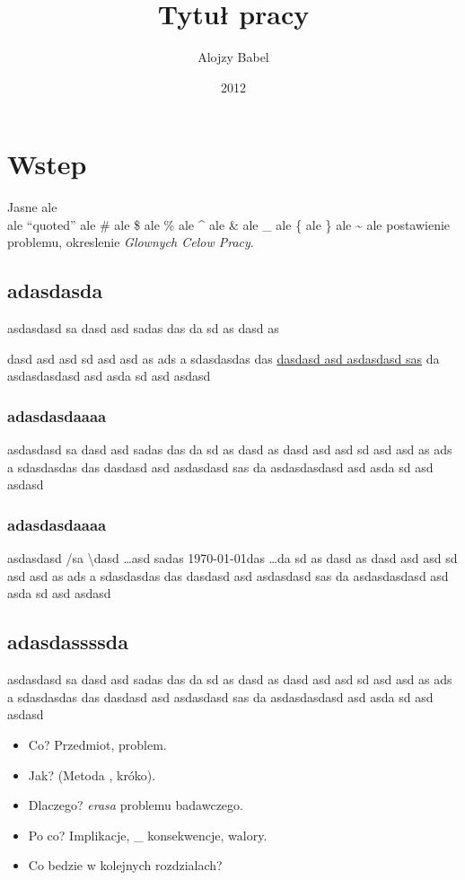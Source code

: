 \documentclass[14pt]{article}
\title{Tytuł pracy}
\author{Alojzy Babel}
\date{2012}
\begin{document}
\maketitle


\section{Wstep}
Jasne ale \\ ale ``quoted'' ale \# ale \$ ale \% ale \^{} ale \& ale \_ ale \{ ale \} ale \~{} ale postawienie problemu, okreslenie \emph{Glownych Celow Pracy}.

\subsection{adasdasda}
asdasdasd sa dasd asd sadas das da sd as dasd as \par
dasd asd asd sd asd asd as ads a sdasdasdas das \underline{dasdasd asd asdasdasd sas} da asdasdasdasd asd asda sd asd asdasd

\subsubsection{adasdasdaaaa}
asdasdasd sa dasd asd sadas das da sd as dasd as dasd \newline
asd asd sd asd asd as ads a sdasdasdas das dasdasd asd asdasdasd sas da asdasdasdasd asd asda sd asd asdasd

\subsubsection{adasdasdaaaa}
asdasdasd \slash sa \textbackslash dasd \ldots asd sadas \today das \ldots da sd as dasd as dasd asd asd sd asd asd as ads a sdasdasdas das dasdasd asd asdasdasd sas da asdasdasdasd asd asda sd asd asdasd

\subsection{adasdassssda}
asdasdasd sa dasd asd sadas das da sd as dasd as dasd asd asd sd asd asd as ads a sdasdasdas das dasdasd asd asdasdasd sas da asdasdasdasd asd asda sd asd asdasd

\begin{itemize}

\item Co? Przedmiot, problem.

\item Jak? (Metoda , króko).

\item Dlaczego? \emph{erasa} problemu badawczego.

\item Po co? Implikacje, \_ konsekwencje, walory.

\item  Co bedzie w kolejnych rozdzialach?
\end{itemize}
\end{document}
